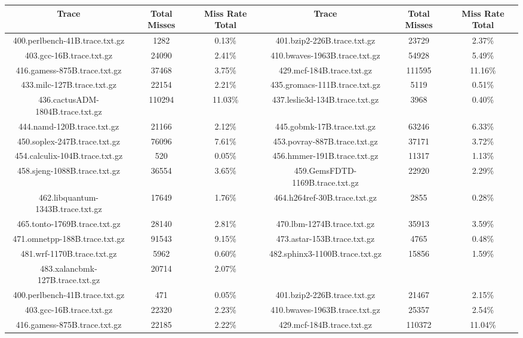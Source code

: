 \begin{table}[H]
\centering
\begin{tabular}{|c|c|c|c|c|c|}
\hline
Trace & Total Misses & Miss Rate Total & Trace & Total Misses & Miss Rate Total \\
\hline
400.perlbench-41B.trace.txt.gz & 1282 & 0.13\% & 401.bzip2-226B.trace.txt.gz & 23729 & 2.37\% \\\hline
403.gcc-16B.trace.txt.gz & 24090 & 2.41\% & 410.bwaves-1963B.trace.txt.gz & 54928 & 5.49\% \\\hline
416.gamess-875B.trace.txt.gz & 37468 & 3.75\% & 429.mcf-184B.trace.txt.gz & 111595 & 11.16\% \\\hline
433.milc-127B.trace.txt.gz & 22154 & 2.21\% & 435.gromacs-111B.trace.txt.gz & 5119 & 0.51\% \\\hline
436.cactusADM-1804B.trace.txt.gz & 110294 & 11.03\% & 437.leslie3d-134B.trace.txt.gz & 3968 & 0.40\% \\\hline
444.namd-120B.trace.txt.gz & 21166 & 2.12\% & 445.gobmk-17B.trace.txt.gz & 63246 & 6.33\% \\\hline
450.soplex-247B.trace.txt.gz & 76096 & 7.61\% & 453.povray-887B.trace.txt.gz & 37171 & 3.72\% \\\hline
454.calculix-104B.trace.txt.gz & 520 & 0.05\% & 456.hmmer-191B.trace.txt.gz & 11317 & 1.13\% \\\hline
458.sjeng-1088B.trace.txt.gz & 36554 & 3.65\% & 459.GemsFDTD-1169B.trace.txt.gz & 22920 & 2.29\% \\\hline
462.libquantum-1343B.trace.txt.gz & 17649 & 1.76\% & 464.h264ref-30B.trace.txt.gz & 2855 & 0.28\% \\\hline
465.tonto-1769B.trace.txt.gz & 28140 & 2.81\% & 470.lbm-1274B.trace.txt.gz & 35913 & 3.59\% \\\hline
471.omnetpp-188B.trace.txt.gz & 91543 & 9.15\% & 473.astar-153B.trace.txt.gz & 4765 & 0.48\% \\\hline
481.wrf-1170B.trace.txt.gz & 5962 & 0.60\% & 482.sphinx3-1100B.trace.txt.gz & 15856 & 1.59\% \\\hline
483.xalancbmk-127B.trace.txt.gz & 20714 & 2.07\% & & & &  \\\hline
400.perlbench-41B.trace.txt.gz & 471 & 0.05\% & 401.bzip2-226B.trace.txt.gz & 21467 & 2.15\% \\\hline
403.gcc-16B.trace.txt.gz & 22320 & 2.23\% & 410.bwaves-1963B.trace.txt.gz & 25357 & 2.54\% \\\hline
416.gamess-875B.trace.txt.gz & 22185 & 2.22\% & 429.mcf-184B.trace.txt.gz & 110372 & 11.04\% \\\hline

\end{tabular}
\end{table}
